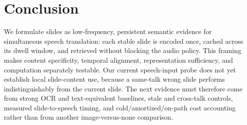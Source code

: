 \section{Conclusion}

We formulate slides as low-frequency, persistent semantic evidence for
simultaneous speech translation: each stable slide is encoded once, cached
across its dwell window, and retrieved without blocking the audio policy. This
framing makes content specificity, temporal alignment, representation
sufficiency, and computation separately testable. Our current speech-input
probe does not yet establish local slide-content use, because a same-talk wrong
slide performs indistinguishably from the current slide. The next evidence must
therefore come from strong OCR and text-equivalent baselines, stale and
cross-talk controls, measured slide-to-speech timing, and cold/amortized/on-path
cost accounting rather than from another image-versus-none comparison.
